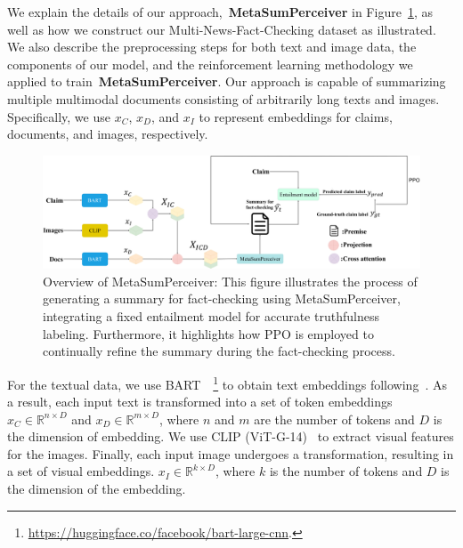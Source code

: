 We explain the details of our approach,~\textbf{MetaSumPerceiver} in Figure~\ref{fig:metaover}, as well as how we construct our Multi-News-Fact-Checking dataset as illustrated. We also describe the preprocessing steps for both text and image data, the components of our model, and the reinforcement learning methodology we applied to train~\textbf{MetaSumPerceiver}. Our approach is capable of summarizing multiple multimodal documents consisting of arbitrarily long texts and images. Specifically, we use $x_C$, $x_D$, and $x_I$ to represent embeddings for claims, documents, and images, respectively.

\begin{figure}
  \centering
  \includegraphics[width=\textwidth, height=\textwidth, keepaspectratio]{images/pipeline_3.2.pdf}
  \caption{Overview of MetaSumPerceiver: This figure illustrates the process of generating a summary for fact-checking using MetaSumPerceiver, integrating a fixed entailment model for accurate truthfulness labeling. Furthermore, it highlights how PPO is employed to continually refine the summary during the fact-checking process.}
  \label{fig:metaover}
\end{figure}

For the textual data, we use BART~\cite{lewis2019bart}~\footnote{ \url{https://huggingface.co/facebook/bart-large-cnn}.}  to obtain text embeddings following~\cite{devlin-etal-2019-bert,liu2019roberta}. As a result, each input text is transformed into a set of token embeddings $x_C \in \mathbb{R}^{n \times D}$ and $x_D \in \mathbb{R}^{m \times D}$, where $n$ and $m$ are the number of tokens and $D$ is the dimension of embedding. We use CLIP (ViT-G-14)~\cite{radford2021learning} to extract visual features for the images. Finally, each input image undergoes a transformation, resulting in a set of visual embeddings. $x_I \in \mathbb{R}^{k \times D}$, where $k$ is the number of tokens and $D$ is the dimension of the embedding.


